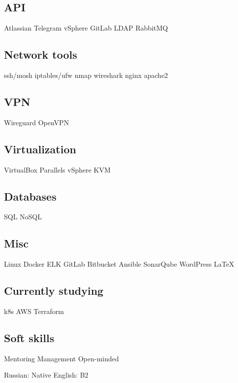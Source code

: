 \documentclass[a4paper]{MagicalCV}
\begin{document}
\begin{minipage}[t]{0.33\textwidth}
\subsection{API}
Atlassian \textbullet{} Telegram \textbullet{} vSphere \textbullet{}
GitLab \textbullet{} LDAP \textbullet{} RabbitMQ
\subsection{Network tools}
ssh/mosh \textbullet{} iptables/ufw \textbullet{} nmap \textbullet{}
wireshark \textbullet{} nginx \textbullet{} apache2
\subsection{VPN}
Wireguard \textbullet{} OpenVPN
\subsection{Virtualization}
VirtualBox \textbullet{} Parallels \textbullet{} vSphere \textbullet{} KVM
\subsection{Databases}
SQL \textbullet{} NoSQL
\subsection{Misc}
Linux \textbullet{} Docker \textbullet{} ELK \textbullet{} GitLab \textbullet{}
Bitbucket \textbullet{} Ansible \textbullet{} SonarQube \textbullet {}
WordPress \textbullet{} \LaTeX
\subsection{Currently studying}
k8s \textbullet{} AWS \textbullet{} Terraform
\subsection{Soft skills}
Mentoring \textbullet{} Management \textbullet{} Open-minded
\sectionsep


Russian: Native \textbullet{} English: B2
\sectionsep

\end{minipage} 
\hfill
\end{document}
